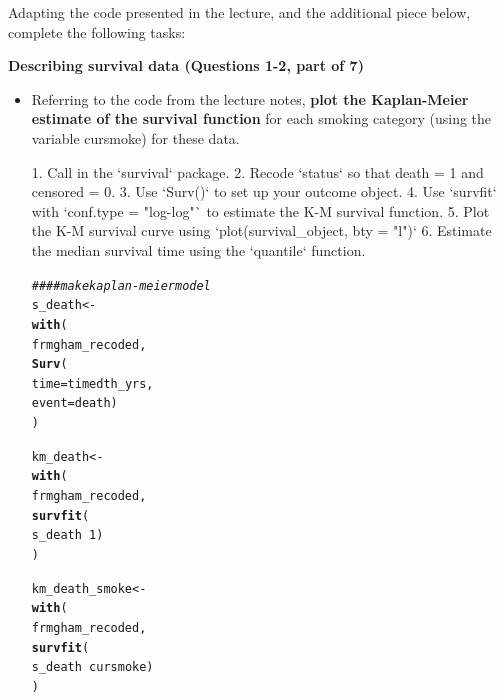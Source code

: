 \documentclass{article}\usepackage[]{graphicx}\usepackage[]{color}
\makeatletter
\newcommand{\hlnum}[1]{\textcolor[rgb]{0.686,0.059,0.569}{#1}}%
\newcommand{\hlcom}[1]{\textcolor[rgb]{0.678,0.584,0.686}{\textit{#1}}}%
\newcommand{\hlopt}[1]{\textcolor[rgb]{0,0,0}{#1}}%
\newcommand{\hlstd}[1]{\textcolor[rgb]{0.345,0.345,0.345}{#1}}%
\newcommand{\hlkwb}[1]{\textcolor[rgb]{0.69,0.353,0.396}{#1}}%
\newcommand{\hlkwc}[1]{\textcolor[rgb]{0.333,0.667,0.333}{#1}}%
\newcommand{\hlkwd}[1]{\textcolor[rgb]{0.737,0.353,0.396}{\textbf{#1}}}%
\newenvironment{kframe}{%
 \def\at@end@of@kframe{}%
 \ifinner\ifhmode%
  \def\at@end@of@kframe{\end{minipage}}%
  \begin{minipage}{\columnwidth}%
 \fi\fi%
 \def\FrameCommand##1{\hskip\@totalleftmargin \hskip-\fboxsep
 \colorbox{shadecolor}{##1}\hskip-\fboxsep
     \hskip-\linewidth \hskip-\@totalleftmargin \hskip\columnwidth}%
 \MakeFramed {\advance\hsize-\width
   \@totalleftmargin\z@ \linewidth\hsize
   \@setminipage}}%
 {\par\unskip\endMakeFramed%
 \at@end@of@kframe}
\newenvironment{knitrout}{}{} %
\makeatother
\begin{document}
Adapting the code presented in the lecture, and the additional piece below, complete the following tasks:

\vspace{2mm}

\textbf{Describing survival data (Questions 1-2, part of 7)}

\begin{itemize}
  \item Referring to the code from the lecture notes, \textbf{plot the Kaplan-Meier estimate of the survival function} for each smoking category (using the variable cursmoke) for these data.
  
1. Call in the `survival` package.   
2. Recode `status` so that death = 1 and censored = 0.   
3. Use `Surv()` to set up your outcome object.   
4. Use `survfit` with `conf.type = "log-log"` to estimate the K-M survival function.   
5. Plot the K-M survival curve using `plot(survival\_object, bty = "l")`   
6. Estimate the median survival time using the `quantile` function.   
  
\begin{knitrout}
\color{fgcolor}\begin{kframe}
\begin{alltt}
\hlcom{#### make kaplan-meier model}
\hlstd{s_death} \hlkwb{<-}
  \hlkwd{with}\hlstd{(}
    \hlstd{frmgham_recoded,}
    \hlkwd{Surv}\hlstd{(}
      \hlkwc{time} \hlstd{= timedth_yrs,}
      \hlkwc{event} \hlstd{= death)}
    \hlstd{)}

\hlstd{km_death} \hlkwb{<-}
  \hlkwd{with}\hlstd{(}
    \hlstd{frmgham_recoded,}
    \hlkwd{survfit}\hlstd{(}
      \hlstd{s_death} \hlopt{~} \hlnum{1}\hlstd{)}
    \hlstd{)}

\hlstd{km_death_smoke} \hlkwb{<-}
  \hlkwd{with}\hlstd{(}
    \hlstd{frmgham_recoded,}
    \hlkwd{survfit}\hlstd{(}
      \hlstd{s_death} \hlopt{~} \hlstd{cursmoke)}
    \hlstd{)}


\end{alltt}
\end{kframe}
\end{knitrout}
\end{itemize}
\end{document}

